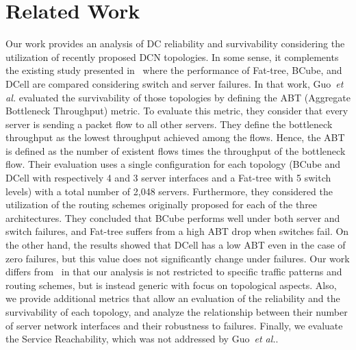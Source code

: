  
\section{Related Work}
\label{sec:related} 
 
Our work provides an analysis of DC reliability and survivability considering the utilization of recently proposed DCN topologies. In some sense, it complements the existing study presented in~\cite{guo2009bcube} where the performance of Fat-tree, BCube, and DCell are compared considering switch and server failures. In that work, Guo~\textit{et al.} evaluated the survivability of those topologies by defining the ABT (Aggregate Bottleneck Throughput) metric. To evaluate this metric, they consider that every server is sending a packet flow to all other servers. They define the bottleneck throughput as the lowest throughput achieved among the flows. Hence, the ABT is defined as the number of existent flows times the throughput of the bottleneck flow. Their evaluation uses a single configuration for each topology (BCube and DCell with respectively 4 and 3 server interfaces and a Fat-tree with 5 switch levels) with a total number of 2,048 servers. Furthermore, they considered the utilization of the routing schemes originally proposed for each of the 
three architectures. They concluded that BCube performs well under both server and switch failures, and Fat-tree suffers from a high ABT drop when switches fail. On the other hand, the results showed that DCell has a low ABT even in the case of zero failures, but this value does not significantly change under failures. 
Our work differs from~\cite{guo2009bcube} in that our analysis is not restricted to specific traffic patterns and routing schemes, but is instead generic with focus on topological aspects. Also, we provide additional metrics that allow an evaluation of the reliability and the survivability of each topology, and analyze the relationship between their number of server network interfaces and their robustness to failures. Finally, we evaluate the Service Reachability, which was not addressed by Guo~\textit{et al.}. 


